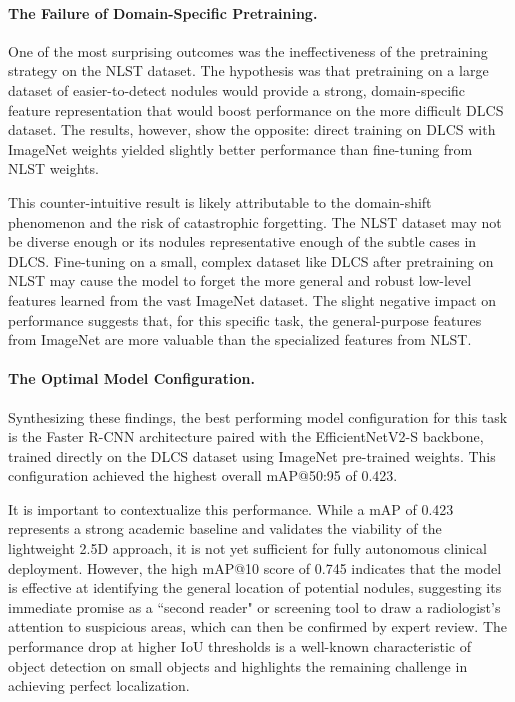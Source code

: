 \paragraph{The Failure of Domain-Specific Pretraining.}
One of the most surprising outcomes was the ineffectiveness of the pretraining strategy on the NLST dataset. The hypothesis was that pretraining on a large dataset of easier-to-detect nodules would provide a strong, domain-specific feature representation that would boost performance on the more difficult DLCS dataset. The results, however, show the opposite: direct training on DLCS with ImageNet weights yielded slightly better performance than fine-tuning from NLST weights.

This counter-intuitive result is likely attributable to the domain-shift phenomenon and the risk of catastrophic forgetting. The NLST dataset may not be diverse enough or its nodules representative enough of the subtle cases in DLCS. Fine-tuning on a small, complex dataset like DLCS after pretraining on NLST may cause the model to forget the more general and robust low-level features learned from the vast ImageNet dataset. The slight negative impact on performance suggests that, for this specific task, the general-purpose features from ImageNet are more valuable than the specialized features from NLST.

\paragraph{The Optimal Model Configuration.}
Synthesizing these findings, the best performing model configuration for this task is the Faster R-CNN architecture paired with the EfficientNetV2-S backbone, trained directly on the DLCS dataset using ImageNet pre-trained weights. This configuration achieved the highest overall mAP@50:95 of 0.423.

It is important to contextualize this performance. While a mAP of 0.423 represents a strong academic baseline and validates the viability of the lightweight 2.5D approach, it is not yet sufficient for fully autonomous clinical deployment. However, the high mAP@10 score of 0.745 indicates that the model is effective at identifying the general location of potential nodules, suggesting its immediate promise as a ``second reader" or screening tool to draw a radiologist's attention to suspicious areas, which can then be confirmed by expert review. The performance drop at higher IoU thresholds is a well-known characteristic of object detection on small objects and highlights the remaining challenge in achieving perfect localization.

